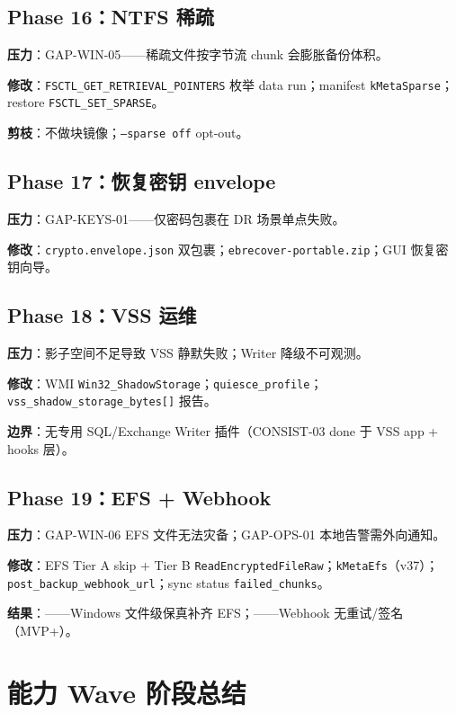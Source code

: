 \subsection{Phase 16：NTFS 稀疏}

\textbf{压力}：GAP-WIN-05——稀疏文件按字节流 chunk 会膨胀备份体积。

\textbf{修改}：\texttt{FSCTL\_GET\_RETRIEVAL\_POINTERS} 枚举 data run；manifest \texttt{kMetaSparse}；restore \texttt{FSCTL\_SET\_SPARSE}。

\textbf{剪枝}：不做块镜像；\texttt{--sparse off} opt-out。

\subsection{Phase 17：恢复密钥 envelope}

\textbf{压力}：GAP-KEYS-01——仅密码包裹在 DR 场景单点失败。

\textbf{修改}：\texttt{crypto.envelope.json} 双包裹；\texttt{ebrecover-portable.zip}；GUI 恢复密钥向导。

\subsection{Phase 18：VSS 运维}

\textbf{压力}：影子空间不足导致 VSS 静默失败；Writer 降级不可观测。

\textbf{修改}：WMI \texttt{Win32\_ShadowStorage}；\texttt{quiesce\_profile}；\texttt{vss\_shadow\_storage\_bytes[]} 报告。

\textbf{边界}：无专用 SQL/Exchange Writer 插件（CONSIST-03 done 于 VSS app + hooks 层）。

\subsection{Phase 19：EFS + Webhook}

\textbf{压力}：GAP-WIN-06 EFS 文件无法灾备；GAP-OPS-01 本地告警需外向通知。

\textbf{修改}：EFS Tier A skip + Tier B \texttt{ReadEncryptedFileRaw}；\texttt{kMetaEfs}（v37）；\texttt{post\_backup\_webhook\_url}；sync status \texttt{failed\_chunks}。

\textbf{结果}：——Windows 文件级保真补齐 EFS；——Webhook 无重试/签名（MVP+）。

\section{能力 Wave 阶段总结}


